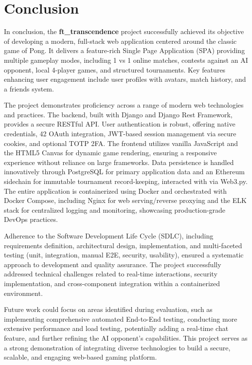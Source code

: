 \chapter*{Conclusion} 

In conclusion, the \textbf{ft\_transcendence} project successfully achieved its objective of developing a modern, full-stack web application centered around the classic game of Pong. It delivers a feature-rich Single Page Application (SPA) providing multiple gameplay modes, including 1 vs 1 online matches, contests against an AI opponent, local 4-player games, and structured tournaments. Key features enhancing user engagement include user profiles with avatars, match history, and a friends system.

The project demonstrates proficiency across a range of modern web technologies and practices. The backend, built with Django and Django Rest Framework, provides a secure RESTful API. User authentication is robust, offering native credentials, 42 OAuth integration, JWT-based session management via secure cookies, and optional TOTP 2FA. The frontend utilizes vanilla JavaScript and the HTML5 Canvas for dynamic game rendering, ensuring a responsive experience without reliance on large frameworks. Data persistence is handled innovatively through PostgreSQL for primary application data and an Ethereum sidechain for immutable tournament record-keeping, interacted with via Web3.py. The entire application is containerized using Docker and orchestrated with Docker Compose, including Nginx for web serving/reverse proxying and the ELK stack for centralized logging and monitoring, showcasing production-grade DevOps practices.

Adherence to the Software Development Life Cycle (SDLC), including requirements definition, architectural design, implementation, and multi-faceted testing (unit, integration, manual E2E, security, usability), ensured a systematic approach to development and quality assurance. The project successfully addressed technical challenges related to real-time interactions, security implementation, and cross-component integration within a containerized environment.

Future work could focus on areas identified during evaluation, such as implementing comprehensive automated End-to-End testing, conducting more extensive performance and load testing, potentially adding a real-time chat feature, and further refining the AI opponent's capabilities. This project serves as a strong demonstration of integrating diverse technologies to build a secure, scalable, and engaging web-based gaming platform.
